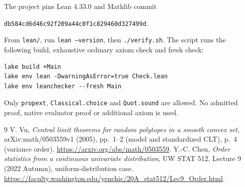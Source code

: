 \documentclass[10pt,a4paper]{article}
\begin{document}
The project pins Lean 4.33.0 and Mathlib commit
\begin{center}\texttt{db584cd6d46c92f209a44c0f1c829460d327499d}.\end{center}
From \texttt{lean/}, run \texttt{lean --version}, then \texttt{./verify.sh}.
The script runs the following build, exhaustive ordinary axiom check and fresh check:
\begin{verbatim}
lake build +Main
lake env lean -DwarningAsError=true Check.lean
lake env leanchecker --fresh Main
\end{verbatim}
Only \texttt{propext}, \texttt{Classical.choice} and \texttt{Quot.sound} are allowed.
No admitted proof, native evaluator proof or additional axiom is used.

\begin{thebibliography}{9}
 V. Vu, \emph{Central limit theorems for random polytopes in a smooth
convex set}, arXiv:math/0503559v1 (2005), pp.~1--2 (model and standardized CLT),
p.~4 (variance order). \url{https://arxiv.org/abs/math/0503559}.
 Y.-C. Chen, \emph{Order statistics from a continuous univariate
distribution}, UW STAT 512, Lecture 9 (2022 Autumn), uniform-distribution case.
\url{https://faculty.washington.edu/yenchic/20A_stat512/Lec9_Order.html}.
\end{thebibliography}
\end{document}
